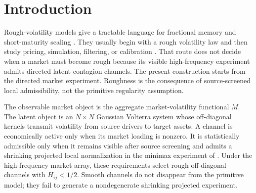 \documentclass[11pt,a4paper]{amsart}
\theoremstyle{plain}
\theoremstyle{definition}
\theoremstyle{remark}
\newcommand{\QQ}{\mathbb{Q}}
\begin{document}
\begin{abstract}
The synchronized mode also carries the pricing and hedging obstruction.  For integrated market
variance \(Q_M=\int_0^T M(t)^2\,dt\), compression to any visible pricing summary leaves a
lower-bounded latent convexity gap, and visible hedges for variance-linked claims satisfy an
explicit lower bound on residual risk whenever the synchronized latent mode retains conditional
variance.  The reduction from Volterra primitives to these claims is derived from the canonical
Perron projection of the latent envelope and an aggregate sufficient-state sigma-field; no
pricing-side factor split is postulated.  Leading-order short-maturity skew statistics of the type
isolated in \cite{vidal2026latent} are visible \(\QQ\)-summaries, but they remain incomplete
relative to latent market-variance convexity.  The resulting phase classification connects
asymmetric latent contagion, roughness, Perron synchronization, coarse-observation jump limits, and
public compression of market-variance risk.
\end{abstract}

\maketitle

\section{Introduction}
Rough-volatility models give a tractable language for fractional memory and short-maturity scaling
\cite{gatheral2018volatility,livieri2018rough}.  They usually begin with a rough volatility law
and then study pricing, simulation, filtering, or calibration
\cite{bayer2016pricing,eleuch2019roughheston,abijaber2019affine}.  That route does not decide when
a market must become rough because its visible high-frequency experiment admits directed
latent-contagion channels.  The present construction starts from the directed market experiment.
Roughness is the consequence of source-screened local admissibility, not the primitive regularity
assumption.

The observable market object is the aggregate market-volatility functional \(M\).  The latent object
is an \(N\times N\) Gaussian Volterra system whose off-diagonal kernels transmit volatility from
source drivers to target assets.  A channel is economically active only when its market loading is
nonzero.  It is statistically admissible only when it remains visible after source screening and
admits a shrinking projected local normalization in the minimax experiment of
\cite{vidal2026econometric}.  Under the high-frequency market array, these requirements select
rough off-diagonal channels with \(H_{ij}<1/2\).  Smooth channels do not disappear from the
primitive model; they fail to generate a nondegenerate shrinking projected experiment.
\end{document}
